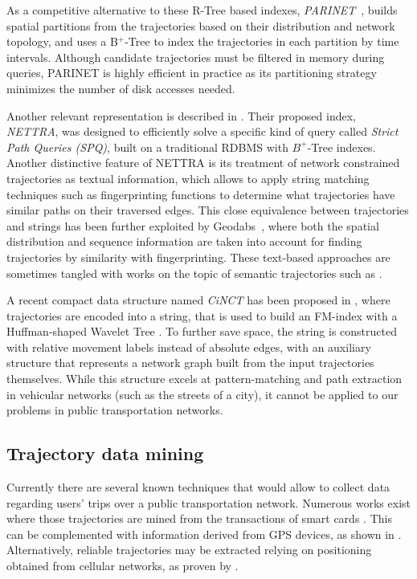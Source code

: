 \documentclass[runningheads]{llncs}
\begin{document}
As a competitive alternative to these R-Tree based indexes, {\em PARINET}~\cite{DBLP:journals/vldb/PopaZOBV11}, builds spatial partitions from the trajectories based on their distribution and network topology, and uses a B$^+$-Tree to index the trajectories in each partition by time intervals. Although candidate trajectories must be filtered in memory during queries, PARINET is highly efficient in practice as its partitioning strategy minimizes the number of disk accesses needed.

Another relevant representation is described in \cite{DBLP:conf/gis/KroghPTT14}. Their proposed index, {\em NETTRA}, was designed to efficiently solve a specific kind of query called {\em Strict Path Queries (SPQ)}, built on a traditional RDBMS with $B^+$-Tree indexes. Another distinctive feature of NETTRA is its treatment of network constrained trajectories as textual information, which allows to apply string matching techniques such as fingerprinting functions to determine what trajectories have similar paths on their traversed edges. This close equivalence between trajectories and strings has been further exploited by Geodabs~\cite{chapuis2018geodabs}, where both the spatial distribution and sequence information are taken into account for finding trajectories by similarity with fingerprinting. These text-based approaches are sometimes tangled with works on the topic of semantic trajectories such as \cite{al2017semantictraj}.


A recent compact data structure named {\em CiNCT} has been proposed in \cite{koide2018cinct}, where trajectories are encoded into a string, that is used to build an FM-index \cite{DBLP:conf/focs/FerraginaM00} with a Huffman-shaped Wavelet Tree \cite{ferragina2009compressed}. To further save space, the string is constructed with relative movement labels instead of absolute edges, with an auxiliary structure that represents a network graph built from the input trajectories themselves. While this structure excels at pattern-matching and path extraction in vehicular networks (such as the streets of a city), it cannot be applied to our problems in public transportation networks.

\subsection{Trajectory data mining}
Currently there are several known techniques that would allow to collect data regarding users' trips over a public transportation network. Numerous works exist where those trajectories are mined from the transactions of smart cards \cite{bhaskar2015passenger,wang2014aggregated}. This can be complemented with information derived from GPS devices, as shown in \cite{ma2014development}. Alternatively, reliable trajectories may be extracted relying on positioning obtained from cellular networks, as proven by \cite{liu2017exploring}.
\end{document}
